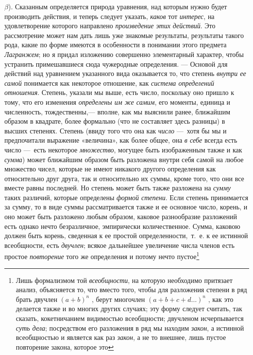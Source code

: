 {$\beta $). Сказанным определяется природа уравнения, над которым нужно будет
производить действия, и теперь следует указать,
{\em каков} тот {\em интерес}, на
удовлетворение которого направлено {\em произведение
этих действий}. Это рассмотрение может нам дать лишь уже знакомые
результаты, результаты такого рода, какие по форме имеются в особенности в
понимании этого предмета {\em Лагранжем}; но я придал
изложению совершенно элементарный характер, чтобы устранить примешавшиеся
сюда чужеродные определения. — Основой для действий над уравнением
указанного вида оказывается то, что степень {\em внутри
ее самой} понимается как некоторое отношение, как
{\em система определений отношения}. Степень, указали
мы выше, есть число, поскольку оно пришло к тому, что его изменения
{\em определены им же самим}, его моменты, единица и
численность, тождественны,— вполне, как мы выяснили ранее, ближайшим
образом в квадрате, более формально (что не составляет здесь разницы) в
высших степенях. Степень (ввиду того что она как
{\em число} —~хотя бы мы и предпочитали выражение
«величина», как более общее, она {\em в себе} всегда
есть число —~есть некоторое {\em множество}, могущее
быть изображенным также и как {\em сумма}) может
ближайшим образом быть разложена внутри себя самой на любое множество
чисел, которые не имеют никакого другого определения как относительно друг
друга, так и относительно их суммы, кроме того, что они все вместе равны
последней. Но степень может быть также разложена на
{\em сумму} таких различий, которые определены
{\em формой степени}. Если степень принимается за
сумму, то в виде суммы рассматривается также и ее основное число, корень, и
оно может быть разложено любым образом, каковое разнообразие разложений
есть однако нечто безразличное, эмпирически количественное. Сумма, каковою
должен быть корень, сведенная к ее простой определенности,~т.~е. к ее
истинной всеобщности, есть {\em двучлен}; всякое
дальнейшее увеличение числа членов есть простое
{\em повторение} того же определения и потому нечто
пустое\footnote{Лишь формализмом той {\em всеобщности}, на
которую необходимо притязает анализ, объясняется то, что вместо того, чтобы
для разложения степени в ряд брать двучлен  $ (a + b)^n $ ,
берут многочлен $ (a + b + c + d \dots)^n $ , как
это делается также и во многих других случаях; эту форму следует считать,
так сказать, кокетничанием видимостью всеобщности; двучленом исчерпывается
{\em суть дела}; посредством его разложения в ряд мы находим
{\em закон}, а истинной всеобщностью и является как раз
{\em закон}, а не то внешнее, лишь пустое повторение закона, которое это
}}
